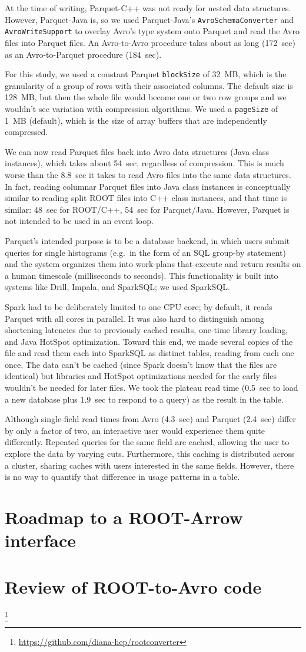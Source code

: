 \documentclass{article}
\begin{document}
At the time of writing, Parquet-C++ was not ready for nested data structures. However, Parquet-Java is, so we used Parquet-Java's {\tt AvroSchemaConverter} and {\tt AvroWriteSupport} to overlay Avro's type system onto Parquet and read the Avro files into Parquet files. An Avro-to-Avro procedure takes about as long (172~sec) as an Avro-to-Parquet procedure (184~sec). 

For this study, we used a constant Parquet {\tt blockSize} of 32~MB, which is the granularity of a group of rows with their associated columns. The default size is 128~MB, but then the whole file would become one or two row groups and we wouldn't see variation with compression algorithms. We used a {\tt pageSize} of 1~MB (default), which is the size of array buffers that are independently compressed.

We can now read Parquet files back into Avro data structures (Java class instances), which takes about 54~sec, regardless of compression. This is much worse than the 8.8~sec it takes to read Avro files into the same data structures. In fact, reading columnar Parquet files into Java class instances is conceptually similar to reading split ROOT files into C++ class instances, and that time is similar: 48~sec for ROOT/C++, 54~sec for Parquet/Java. However, Parquet is not intended to be used in an event loop.

Parquet's intended purpose is to be a database backend, in which users submit queries for single histograms (e.g.\ in the form of an SQL group-by statement) and the system organizes them into work-plans that execute and return results on a human timescale (milliseconds to seconds). This functionality is built into systems like Drill, Impala, and SparkSQL; we used SparkSQL.

Spark had to be deliberately limited to one CPU core; by default, it reads Parquet with all cores in parallel. It was also hard to distinguish among shortening latencies due to previously cached results, one-time library loading, and Java HotSpot optimization. Toward this end, we made several copies of the file and read them each into SparkSQL as distinct tables, reading from each one once. The data can't be cached (since Spark doesn't know that the files are identical) but libraries and HotSpot optimizations needed for the early files wouldn't be needed for later files. We took the plateau read time (0.5~sec to load a new database plus 1.9~sec to respond to a query) as the result in the table.

Although single-field read times from Avro (4.3~sec) and Parquet (2.4~sec) differ by only a factor of two, an interactive user would experience them quite differently. Repeated queries for the same field are cached, allowing the user to explore the data by varying cuts. Furthermore, this caching is distributed across a cluster, sharing caches with users interested in the same fields. However, there is no way to quantify that difference in usage patterns in a table.

\section*{Roadmap to a ROOT-Arrow interface}




\section*{Review of ROOT-to-Avro code}

\footnote{\url{https://github.com/diana-hep/rootconverter}}
\end{document}
